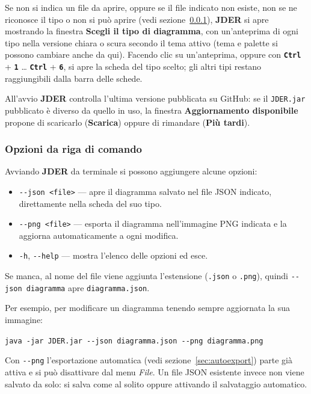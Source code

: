 \documentclass[a4paper,11pt]{article}
\newcommand{\key}[1]{\texttt{\textbf{#1}}}
\newcommand{\menu}[1]{\textit{#1}}
\newcommand{\uielement}[1]{\textbf{#1}}
\newcommand{\jder}{\textbf{JDER}}
\begin{document}
Se non si indica un file da aprire, oppure se il file indicato non esiste, non se ne riconosce il
tipo o non si può aprire (vedi sezione~\ref{sec:cli}), \jder{} si apre mostrando la finestra
\uielement{Scegli il tipo di diagramma}, con un'anteprima di ogni tipo nella versione chiara o
scura secondo il tema attivo (tema e palette si possono cambiare anche da qui). Facendo clic su
un'anteprima, oppure con \key{Ctrl} + \key{1} \ldots{} \key{Ctrl} + \key{6}, si apre la scheda
del tipo scelto; gli altri tipi restano raggiungibili dalla barra delle schede.

All'avvio \jder{} controlla l'ultima versione pubblicata su GitHub: se il \texttt{JDER.jar}
pubblicato è diverso da quello in uso, la finestra \uielement{Aggiornamento disponibile} propone
di scaricarlo (\uielement{Scarica}) oppure di rimandare (\uielement{Più tardi}).

\subsubsection{Opzioni da riga di comando}
\label{sec:cli}

Avviando \jder{} da terminale si possono aggiungere alcune opzioni:

\begin{itemize}
  \item \texttt{-{}-json <file>} --- apre il diagramma salvato nel file JSON indicato, direttamente
        nella scheda del suo tipo.
  \item \texttt{-{}-png <file>} --- esporta il diagramma nell'immagine PNG indicata e la aggiorna
        automaticamente a ogni modifica.
  \item \texttt{-h}, \texttt{-{}-help} --- mostra l'elenco delle opzioni ed esce.
\end{itemize}

Se manca, al nome del file viene aggiunta l'estensione (\texttt{.json} o \texttt{.png}), quindi
\texttt{-{}-json diagramma} apre \texttt{diagramma.json}.

Per esempio, per modificare un diagramma tenendo sempre aggiornata la sua immagine:

\begin{center}
  \texttt{java -jar JDER.jar -{}-json diagramma.json -{}-png diagramma.png}
\end{center}

Con \texttt{-{}-png} l'esportazione automatica (vedi sezione~\ref{sec:autoexport}) parte già
attiva e si può disattivare dal menu \menu{File}. Un file JSON esistente invece non viene salvato
da solo: si salva come al solito oppure attivando il salvataggio automatico.
\end{document}

